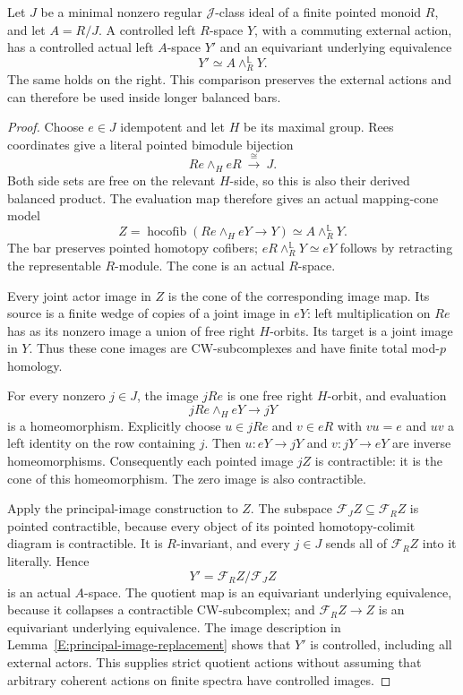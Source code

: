 \begin{lemma}\label{E:regular-controlled-localization}
Let $J$ be a minimal nonzero regular $\mathcal J$-class ideal of a
finite pointed monoid $R$, and let $A=R/J$.  A controlled left
$R$-space $Y$, with a commuting external action, has a controlled
actual left $A$-space $Y'$ and an equivariant underlying equivalence
\[
 Y'\simeq A\mathbin{\wedge_R^{\mathbb L}}Y.
\]
The same holds on the right.  This comparison preserves the external
actions and can therefore be used inside longer balanced bars.
\end{lemma}

\begin{proof}
Choose $e\in J$ idempotent and let $H$ be its maximal group.
Rees coordinates give a literal pointed bimodule bijection
\[
 Re\wedge_H eR\ \xrightarrow{\ \cong\ }\ J.
\]
Both side sets are free on the relevant $H$-side, so this is also
their derived balanced product.  The evaluation map therefore gives
an actual mapping-cone model
\[
 Z=\operatorname{hocofib}(Re\wedge_H eY\longrightarrow Y)
       \simeq A\mathbin{\wedge_R^{\mathbb L}}Y.
\]
The bar preserves pointed homotopy cofibers; $eR\wedge_R^{\mathbb L}Y
\simeq eY$ follows by retracting the representable $R$-module.
The cone is an actual $R$-space.

Every joint actor image in $Z$ is the cone of the corresponding
image map.  Its source is a finite wedge of copies of a joint image
in $eY$: left multiplication on $Re$ has as its nonzero image a
union of free right $H$-orbits.  Its target is a joint image in $Y$.
Thus these cone images are CW-subcomplexes and have finite total
mod-$p$ homology.

For every nonzero $j\in J$, the image $jRe$ is one free right
$H$-orbit, and evaluation
\[
 jRe\wedge_H eY\longrightarrow jY
\]
is a homeomorphism.  Explicitly choose $u\in jRe$ and $v\in eR$
with $vu=e$ and $uv$ a left identity on the row containing $j$.
Then $u:eY\to jY$ and $v:jY\to eY$ are inverse homeomorphisms.
Consequently each pointed image $jZ$ is contractible: it is the cone
of this homeomorphism.  The zero image is also contractible.

Apply the principal-image construction to $Z$.  The subspace
$\mathcal F_JZ\subseteq\mathcal F_RZ$ is pointed contractible,
because every object of its pointed homotopy-colimit diagram is
contractible.  It is $R$-invariant, and every $j\in J$ sends all of
$\mathcal F_RZ$ into it literally.  Hence
\[
 Y'=\mathcal F_RZ/\mathcal F_JZ
\]
is an actual $A$-space.  The quotient map is an equivariant underlying
equivalence, because it collapses a contractible CW-subcomplex; and
$\mathcal F_RZ\to Z$ is an equivariant underlying equivalence.
The image description in Lemma~\ref{E:principal-image-replacement}
shows that $Y'$ is controlled, including all external actors.
This supplies strict quotient actions without assuming that arbitrary
coherent actions on finite spectra have controlled images.
\end{proof}


